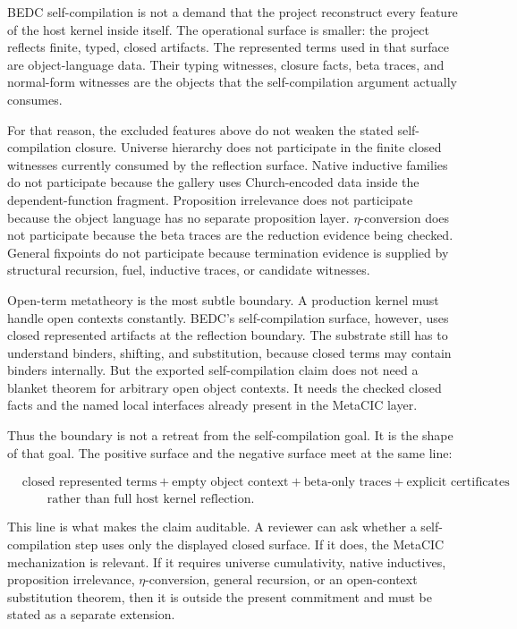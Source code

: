 BEDC self-compilation is not a demand that the project reconstruct every
feature of the host kernel inside itself.  The operational surface is smaller:
the project reflects finite, typed, closed artifacts.  The represented terms
used in that surface are object-language data.  Their typing witnesses,
closure facts, beta traces, and normal-form witnesses are the objects that
the self-compilation argument actually consumes.

For that reason, the excluded features above do not weaken the stated
self-compilation closure.  Universe hierarchy does not participate in the
finite closed witnesses currently consumed by the reflection surface.
Native inductive families do not participate because the gallery uses
Church-encoded data inside the dependent-function fragment.  Proposition
irrelevance does not participate because the object language has no separate
proposition layer.  $\eta$-conversion does not participate because the beta
traces are the reduction evidence being checked.  General fixpoints do not
participate because termination evidence is supplied by structural recursion,
fuel, inductive traces, or candidate witnesses.

Open-term metatheory is the most subtle boundary.  A production kernel must
handle open contexts constantly.  BEDC's self-compilation surface, however,
uses closed represented artifacts at the reflection boundary.  The substrate
still has to understand binders, shifting, and substitution, because closed
terms may contain binders internally.  But the exported self-compilation
claim does not need a blanket theorem for arbitrary open object contexts.  It
needs the checked closed facts and the named local interfaces already present
in the MetaCIC layer.

Thus the boundary is not a retreat from the self-compilation goal.  It is the
shape of that goal.  The positive surface and the negative surface meet at
the same line:

$$
\begin{aligned}
  &\text{closed represented terms}
  + \text{empty object context}
  + \text{beta-only traces}
  + \text{explicit certificates} \\
  &\qquad\text{rather than full host kernel reflection.}
\end{aligned}
$$

This line is what makes the claim auditable.  A reviewer can ask whether a
self-compilation step uses only the displayed closed surface.  If it does,
the MetaCIC mechanization is relevant.  If it requires universe cumulativity,
native inductives, proposition irrelevance, $\eta$-conversion, general
recursion, or an open-context substitution theorem, then it is outside the
present commitment and must be stated as a separate extension.

